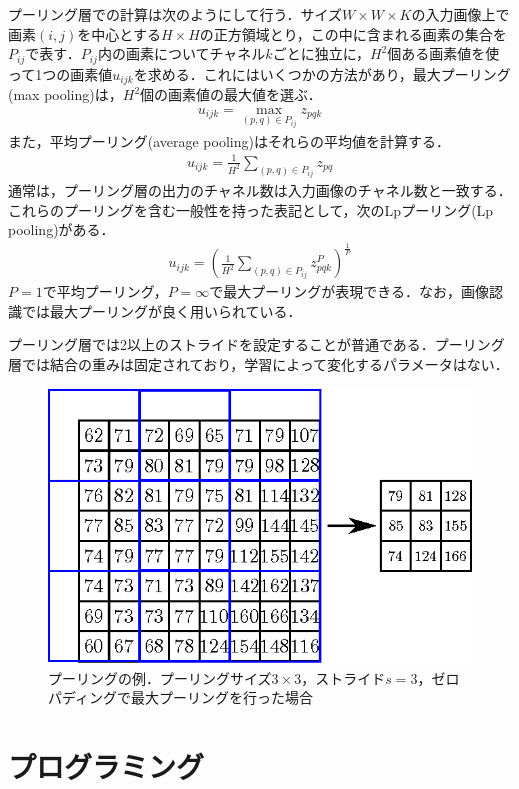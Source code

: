\documentclass[a4paper,10pt]{jsarticle}
\begin{document}
プーリング層での計算は次のようにして行う．サイズ$W \times W \times K$の入力画像上で画素$(i,j)$を中心とする$H\times H$の正方領域とり，この中に含まれる画素の集合を$P_{ij}$で表す．$P_{ij}$内の画素についてチャネル$k$ごとに独立に，$H^2$個ある画素値を使って1つの画素値$u_{ijk}$を求める．これにはいくつかの方法があり，最大プーリング(max pooling)は，$H^{2}$個の画素値の最大値を選ぶ．
\begin{eqnarray}
 u_{ijk} = \max_{(p,q) \in P_{ij}} z_{pqk}
\end{eqnarray}
また，平均プーリング(average pooling)はそれらの平均値を計算する．
\begin{eqnarray}
 u_{ijk} = \frac{1}{H^{2}}\sum_{(p,q) \in P_{ij}} z_{pq}
\end{eqnarray}
通常は，プーリング層の出力のチャネル数は入力画像のチャネル数と一致する．
これらのプーリングを含む一般性を持った表記として，次のLpプーリング(Lp pooling)がある．
\begin{eqnarray}
 u_{ijk} = \left(\frac{1}{H^{2}}\sum_{(p,q) \in P_{ij}}z^{P}_{pqk}\right)^{\frac{1}{P}}
\end{eqnarray}
$P=1$で平均プーリング，$P=\infty$で最大プーリングが表現できる．なお，画像認識では最大プーリングが良く用いられている．

プーリング層では2以上のストライドを設定することが普通である．プーリング層では結合の重みは固定されており，学習によって変化するパラメータはない．
\begin{figure}[bt]
 \centering
 \includegraphics[scale = 1]{fig/eps/pooling.eps}
 \caption{プーリングの例．プーリングサイズ$3\times 3$，ストライド$s=3$，ゼロパディングで最大プーリングを行った場合}
\end{figure}

\section{プログラミング}
\end{document}
